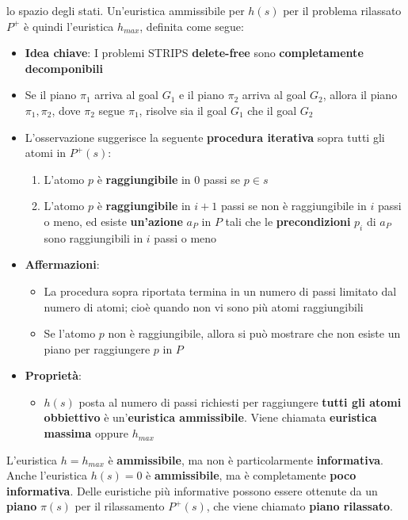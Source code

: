 \documentclass[12pt]{article}
\begin{document}
lo spazio degli stati. Un'euristica ammissibile per $h(s)$ per il problema rilassato $P^+$ è quindi l'euristica $h_{max}$, definita come segue:
\begin{itemize}
    \item \textbf{Idea chiave}: I problemi STRIPS \textbf{delete-free} sono \textbf{completamente decomponibili}
    \item Se il piano $\pi_1$ arriva al goal $G_1$ e il piano $\pi_2$ arriva al goal $G_2$, allora il piano $\pi_1, \pi_2$, dove $\pi_2$ segue $\pi_1$, risolve sia il goal $G_1$ che il goal $G_2$
    \item L'osservazione suggerisce la seguente \textbf{procedura iterativa} sopra tutti gli atomi in $P^+(s)$:
    \begin{enumerate}
        \item L'atomo $p$ è \textbf{raggiungibile} in 0 passi se $p \in s$
        \item L'atomo $p$ è \textbf{raggiungibile} in $i + 1$ passi se non è raggiungibile in $i$ passi o meno, ed esiste \textbf{un'azione} $a_P$ in $P$ tali che le \textbf{precondizioni} $p_i$ di $a_P$ sono raggiungibili in $i$ passi o meno        
    \end{enumerate}
    \item \textbf{Affermazioni}:
    \begin{itemize}
        \item La procedura sopra riportata termina in un numero di passi limitato dal numero di atomi; cioè quando non vi sono più atomi raggiungibili
        \item Se l'atomo $p$ non è raggiungibile, allora si può mostrare che non esiste un piano per raggiungere $p$ in $P$
    \end{itemize}
    \item \textbf{Proprietà}:
    \begin{itemize}
        \item $h(s)$ posta al numero di passi richiesti per raggiungere \textbf{tutti gli atomi obbiettivo} è un'\textbf{euristica ammissibile}. Viene chiamata \textbf{euristica massima} oppure $h_{max}$
    \end{itemize}
\end{itemize}
L'euristica $h = h_{max}$ è \textbf{ammissibile}, ma non è particolarmente \textbf{informativa}.
Anche l'euristica $h(s) = 0$ è \textbf{ammissibile}, ma è completamente \textbf{poco informativa}.
Delle euristiche più informative possono essere ottenute da un \textbf{piano} $\pi(s)$ per il rilassamento $P^+(s)$, che viene chiamato \textbf{piano rilassato}.
\end{document}

